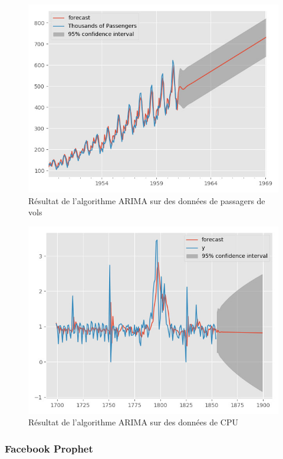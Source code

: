 \documentclass[paper=a4, fontsize=11pt]{scrartcl}
\begin{document}
\begin{figure}[H]
    \centering
    \includegraphics[width=15cm]{img/ARIMA_forecast_aircraft.jpg}
    \caption{Résultat de l'algorithme ARIMA sur des données de passagers de vols}
    \label{f-ARIMAResultAirlines}
\end{figure}

\begin{figure}[H]
    \centering
    \includegraphics[width=15cm]{img/ARIMA_forecast_cpu.jpg}
    \caption{Résultat de l'algorithme ARIMA sur des données de CPU}
    \label{f-ARIMAResultCPU}
\end{figure}

\subsubsection{Facebook Prophet}
\end{document}
